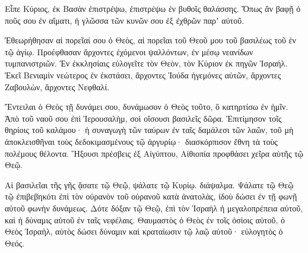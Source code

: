 {Εἶπε Κύριος, ἐκ Βασὰν ἐπιστρέψω, ἐπιστρέψω ἐν βυθοῖς θαλάσσης.
Ὅπως ἂν βαφῇ ὁ ποῦς σου ἐν αἵματι, ἡ γλῶσσα τῶν κυνῶν σου ἐξ ἐχθρῶν παρʼ αὐτοῦ.
\par }{\PP {}Ἐθεωρήθησαν αἱ πορεῖαί σου ὁ Θεὸς, αἱ πορεῖαι τοῦ Θεοῦ μου τοῦ βασιλέως τοῦ ἐν τῷ ἁγίῳ.
Προέφθασαν ἄρχοντες ἐχόμενοι ψαλλόντων, ἐν μέσῳ νεανίδων τυμπανιστριῶν.
Ἐν ἐκκλησίαις εὐλογεῖτε τὸν Θεὸν, τὸν Κύριον ἐκ πηγῶν Ἰσραήλ.
Ἐκεῖ Βενιαμὶν νεώτερος ἐν ἐκστάσει, ἄρχοντες Ἰούδα ἡγεμόνες αὐτῶν, ἄρχοντες Ζαβουλὼν, ἄρχοντες Νεφθαλί.
\par }{\PP {}Ἔντειλαι ὁ Θεὸς τῇ δυνάμει σου, δυνάμωσον ὁ Θεὸς τοῦτο, ὃ κατηρτίσω ἐν ἡμῖν.
Ἀπὸ τοῦ ναοῦ σου ἐπὶ Ἱερουσαλὴμ, σοὶ οἴσουσι βασιλεῖς δῶρα.
Ἐπιτίμησον τοῖς θηρίοις τοῦ καλάμου· ἡ συναγωγὴ τῶν ταύρων ἐν ταῖς δαμάλεσι τῶν λαῶν, τοῦ μὴ ἀποκλεισθῆναι τοὺς δεδοκιμασμένους τῷ ἀργυρίῳ· διασκόρπισον ἔθνη τὰ τοὺς πολέμους θέλοντα.
Ἥξουσι πρέσβεις ἐξ Αἰγύπτου, Αἰθιοπία προφθάσει χεῖρα αὐτῆς τῷ Θεῷ.
\par }{\PP {}Αἱ βασιλεῖαι τῆς γῆς ᾄσατε τῷ Θεῷ, ψάλατε τῷ Κυρίῳ. διάψαλμα.
Ψάλατε τῷ Θεῷ τῷ ἐπιβεβηκότι ἐπὶ τὸν οὐρανὸν τοῦ οὐρανοῦ κατὰ ἀνατολὰς, ἰδοὺ δώσει ἐν τῇ φωνῇ αὐτοῦ φωνὴν δυνάμεως.
Δότε δόξαν τῷ Θεῷ, ἐπὶ τὸν Ἰσραὴλ ἡ μεγαλοπρέπεια αὐτοῦ, καὶ ἡ δύναμις αὐτοῦ ἐν ταῖς νεφέλαις.
Θαυμαστὸς ὁ Θεὸς ἐν τοῖς ὁσίοις αὐτοῦ, ὁ Θεὸς Ἰσραὴλ, αὐτὸς δώσει δύναμιν καὶ κραταίωσιν τῷ λαῷ αὐτοῦ· εὐλογητὸς ὁ Θεός.

}
